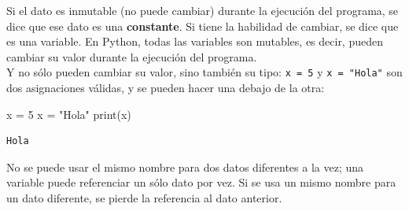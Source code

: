 \documentclass[
  letterpaper,
  DIV=11,
  numbers=noendperiod]{scrreprt}
\newenvironment{Shaded}{\begin{snugshade}}{\end{snugshade}}
\newcommand{\BuiltInTok}[1]{\textcolor[rgb]{0.00,0.23,0.31}{#1}}
\newcommand{\DecValTok}[1]{\textcolor[rgb]{0.68,0.00,0.00}{#1}}
\newcommand{\NormalTok}[1]{\textcolor[rgb]{0.00,0.23,0.31}{#1}}
\newcommand{\OperatorTok}[1]{\textcolor[rgb]{0.37,0.37,0.37}{#1}}
\newcommand{\StringTok}[1]{\textcolor[rgb]{0.13,0.47,0.30}{#1}}
\begin{document}
\begin{tcolorbox}[enhanced jigsaw, bottomrule=.15mm, leftrule=.75mm, opacityback=0, colback=white, toprule=.15mm, bottomtitle=1mm, opacitybacktitle=0.6, rightrule=.15mm, left=2mm, arc=.35mm, coltitle=black, title=\textcolor{quarto-callout-note-color}{\faInfo}\hspace{0.5em}{Variables y Constantes}, breakable, toptitle=1mm, colframe=quarto-callout-note-color-frame, titlerule=0mm, colbacktitle=quarto-callout-note-color!10!white]

Si el dato es inmutable (no puede cambiar) durante la ejecución del
programa, se dice que ese dato es una \textbf{constante}. Si tiene la
habilidad de cambiar, se dice que es una variable. En Python, todas las
variables son mutables, es decir, pueden cambiar su valor durante la
ejecución del programa.\\
Y no sólo pueden cambiar su valor, sino también su tipo:
\texttt{x\ =\ 5} y \texttt{x\ =\ "Hola"} son dos asignaciones válidas, y
se pueden hacer una debajo de la otra:

\begin{Shaded}
\begin{Highlighting}[]
\NormalTok{x }\OperatorTok{=} \DecValTok{5}
\NormalTok{x }\OperatorTok{=} \StringTok{"Hola"}
\BuiltInTok{print}\NormalTok{(x)}
\end{Highlighting}
\end{Shaded}

\begin{verbatim}
Hola
\end{verbatim}

\end{tcolorbox}

\begin{tcolorbox}[enhanced jigsaw, bottomrule=.15mm, leftrule=.75mm, opacityback=0, colback=white, toprule=.15mm, bottomtitle=1mm, opacitybacktitle=0.6, rightrule=.15mm, left=2mm, arc=.35mm, coltitle=black, title=\textcolor{quarto-callout-warning-color}{\faExclamationTriangle}\hspace{0.5em}{Nombres de Variables}, breakable, toptitle=1mm, colframe=quarto-callout-warning-color-frame, titlerule=0mm, colbacktitle=quarto-callout-warning-color!10!white]

No se puede usar el mismo nombre para dos datos diferentes a la vez; una
variable puede referenciar un sólo dato por vez. Si se usa un mismo
nombre para un dato diferente, se pierde la referencia al dato
anterior.\\

\end{tcolorbox}
\end{document}
